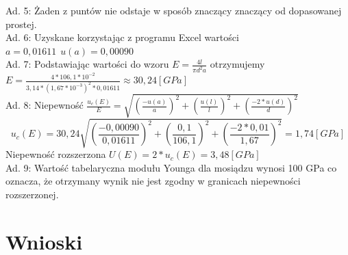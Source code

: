 \documentclass[a4paper,10pt,twoside]{article}
\begin{document}
\begin{figure}[h]
\end{figure}
\noindent
Ad. 5: Żaden z puntów nie odstaje w sposób znaczący znaczący od dopasowanej prostej.\\
Ad. 6: Uzyskane korzystając z programu Excel wartości $a = 0,01611 \hspace{5pt}u(a) = 0,00090$\\
Ad. 7: Podstawiając wartości do wzoru $E = \frac{4l}{\pi d^2 a}$ otrzymujemy $E = \frac{4*106,1*10^{-2}}{3,14 * (1,67*10^{-3})^2 * 0,01611} \approx 30,24[GPa]$\\
Ad. 8: Niepewność $\frac{u_c(E)}{E} = \sqrt{\left (\frac{-u(a)}{a} \right )^2 + \left (\frac{u(l)}{l} \right )^2 + \left (\frac{-2*u(d)}{d} \right )^2}$ $$u_c(E) = 30,24\sqrt{\left (\frac{-0,00090}{0,01611} \right )^2 + \left (\frac{0,1}{106,1} \right )^2 + \left (\frac{-2*0,01}{1,67} \right )^2} = 1,74[GPa]$$ Niepewność rozszerzona $U(E) = 2*u_c(E) = 3,48[GPa]$\\
Ad. 9: Wartość tabelaryczna modułu Younga dla mosiądzu wynosi 100 GPa co oznacza, że otrzymany wynik nie jest zgodny w granicach niepewności rozszerzonej.

	\section{Wnioski}
\end{document}
